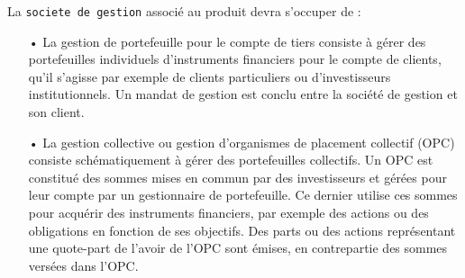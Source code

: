 \documentclass[french,12pt,a4paper]{article}
\begin{document}
La \lstinline!societe de gestion! associé au produit devra s'occuper de :\\
\begin{itemize}
\item[•]
	La gestion de portefeuille pour le compte de tiers consiste à gérer des portefeuilles individuels d'instruments financiers pour le compte de clients, qu'il s'agisse par exemple de clients particuliers ou d'investisseurs institutionnels. Un mandat de gestion est conclu entre la société de gestion et son client.
\item[•]
	La gestion collective ou gestion d’organismes de placement collectif (OPC) consiste schématiquement à gérer des portefeuilles collectifs. Un OPC est constitué des sommes mises en commun par des investisseurs et gérées pour leur compte par un gestionnaire de portefeuille. Ce dernier utilise ces sommes pour acquérir des instruments financiers, par exemple des actions ou des obligations en fonction de ses objectifs. Des parts ou des actions représentant une quote-part de l’avoir de l’OPC sont émises, en contrepartie des sommes versées dans l’OPC. \\
\end{itemize}
\end{document}
